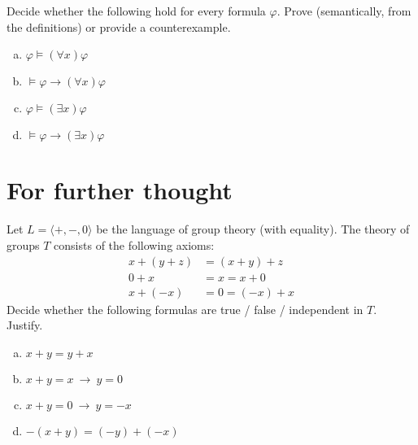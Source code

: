 \begin{problem}
    
    Decide whether the following hold for every formula $\varphi$. Prove (semantically, from the definitions) or provide a counterexample.
    \begin{enumerate}[(a)]
       \item $\varphi \models (\forall x)\varphi$
       \item $\models \varphi \to (\forall x)\varphi$
       \item $\varphi \models (\exists x)\varphi$
       \item $\models \varphi \to (\exists x)\varphi$
    \end{enumerate}

\end{problem}


\section*{For further thought}


\begin{problem}

    Let $L=\langle +, -, 0\rangle$ be the language of group theory (with equality). The theory of groups $T$ consists of the following axioms:
    \begin{align*}
    x+(y+z)&=(x+y)+z\\
    0+x&=x=x+0\\
    x+(-x)&=0=(-x)+x
    \end{align*}
    Decide whether the following formulas are true / false / independent in $T$. Justify.
    \begin{enumerate}[(a)]
        \item $x+y=y+x$
        \item $x+y=x\ \rightarrow\ y=0$
        \item $x+y=0\ \rightarrow\ y=-x$
        \item $-(x+y)=(-y)+(-x)$
    \end{enumerate}

\end{problem}




